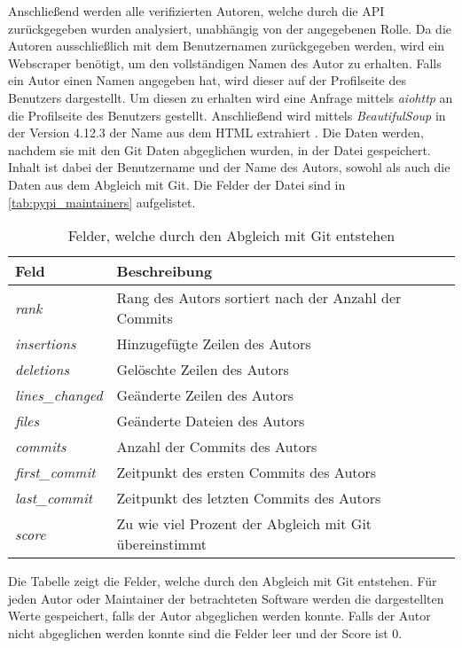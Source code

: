 Anschließend werden alle verifizierten Autoren, welche durch die API zurückgegeben wurden analysiert, unabhängig von der angegebenen Rolle.
Da die Autoren ausschließlich mit dem Benutzernamen zurückgegeben werden, wird ein Webscraper benötigt, um den vollständigen Namen des Autor zu erhalten.
Falls ein Autor einen Namen angegeben hat, wird dieser auf der Profilseite des Benutzers dargestellt.
Um diesen zu erhalten wird eine Anfrage mittels \emph{aiohttp} an die Profilseite des Benutzers gestellt.
Anschließend wird mittels \emph{BeautifulSoup} in der Version 4.12.3 der Name aus dem HTML extrahiert \autocite{richardson_beautifulsoup4_2024}.
Die Daten werden, nachdem sie mit den Git Daten abgeglichen wurden, in der Datei  gespeichert.
Inhalt ist dabei der Benutzername und der Name des Autors, sowohl als auch die Daten aus dem Abgleich mit Git.
Die Felder der Datei sind in \autoref{tab:pypi_maintainers} aufgelistet.

\begin{table}
    \centering
    \begin{tabularx}{\textwidth}{XL{10.2cm}}
        \toprule
        \textbf{Feld}         & \textbf{Beschreibung} \\ \midrule
        \emph{rank}           & Rang des Autors sortiert nach der Anzahl der Commits   \\
        \emph{insertions}     & Hinzugefügte Zeilen des Autors                         \\
        \emph{deletions}      & Gelöschte Zeilen des Autors                            \\
        \emph{lines\_changed} & Geänderte Zeilen des Autors                            \\
        \emph{files}          & Geänderte Dateien des Autors                           \\
        \emph{commits}        & Anzahl der Commits des Autors                          \\
        \emph{first\_commit}  & Zeitpunkt des ersten Commits des Autors                \\
        \emph{last\_commit}   & Zeitpunkt des letzten Commits des Autors               \\
        \emph{score}          & Zu wie viel Prozent der Abgleich mit Git übereinstimmt \\
        \bottomrule
    \end{tabularx}
    \caption{Felder, welche durch den Abgleich mit Git entstehen}
    \label{tab:abgleich_felder}
    \small
    \raggedright
    Die Tabelle zeigt die Felder, welche durch den Abgleich mit Git entstehen. Für jeden Autor oder Maintainer der betrachteten Software werden die dargestellten Werte gespeichert, falls der Autor abgeglichen werden konnte. Falls der Autor nicht abgeglichen werden konnte sind die Felder leer und der Score ist 0.
\end{table}

